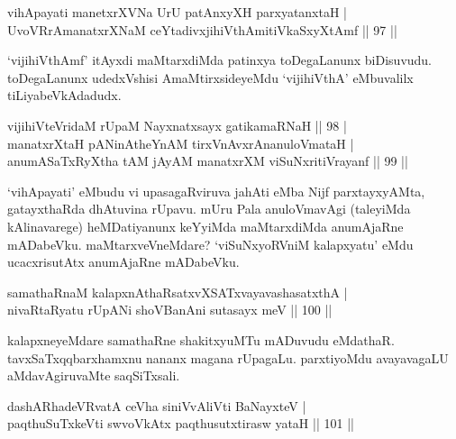 
\begin{shl}
vihApayati manetxrXVNa UrU patAnxyXH parxyatanxtaH | \\
UvoVRrAmanatxrXNaM ceYtadivxjihiVthAmitiVkaSxyXtAmf \hfill|| 97 || 
\end{shl}

\begin{artha}
`vijihiVthAmf' itAyxdi maMtarxdiMda patinxya toDegaLanunx biDisuvudu. 
toDegaLanunx udedxVshisi AmaMtirxsideyeMdu `vijihiVthA' eMbuvalilx 
tiLiyabeVkAdadudx.
\end{artha}


\begin{shl}
vijihiVteVridaM rUpaM Nayxnatxsayx gatikamaRNaH \hfill|| 98 | \\
manatxrXtaH pANinA\s theYnAM tirxVnAvxrAnanuloVmataH | \\
anumASaTxRyXtha tAM jAyAM manatxrXM viSuNxritiVrayanf \hfill|| 99 || 
\end{shl}

\begin{artha}
`vihApayati' eMbudu vi upasagaRviruva ja{hA}ti eMba Nijf parxtayxyAMta, 
gatayxthaRda dhAtuvina rUpavu. mUru Pala anuloVmavAgi (taleyiMda 
kAlinavarege) heMDatiyanunx keYyiMda maMtarxdiMda anumAjaRne 
mADabeVku. maMtarxveVneMdare? `viSuNxyoRVniM kalapxyatu' eMdu 
ucacxrisutAtx anumAjaRne mADabeVku.
\end{artha}


\begin{shl}
samathaRnaM kalapxnAthaRsatxvXSATx\s vayavashasatxthA | \\
nivaRtaRyatu rUpANi shoVBanAni sutasayx meV \hfill|| 100 || 
\end{shl}

\begin{artha}
kalapxneyeMdare samathaRne shakitxyuMTu mADuvudu eMdathaR. 
tavxSaTxqqbarxhamxnu nananx magana rUpagaLu. parxtiyoMdu avayavagaLU 
aMdavAgiruvaMte saqSiTxsali.
\end{artha}


\begin{shl}
dashARhadeVRvatA ceVha siniVvAliVti BaNayxteV | \\
paqthuSuTxkeVti swvoVkAtx paqthusutxtirasw yataH \hfill|| 101 || 
\end{shl}

